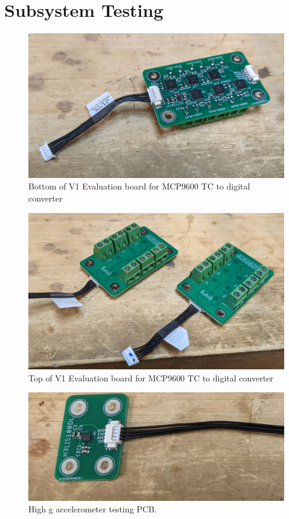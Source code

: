\documentclass{article}
\begin{document}
\section{Subsystem Testing}
\label{appb}

\begin{figure}[H]
	\centering
	\includegraphics[width=\textwidth]{images/tc-board-bottom}
	\caption{Bottom of V1 Evaluation board for MCP9600 TC to digital converter}
	\label{fig:tc-board-bottom}
\end{figure}

\begin{figure}[h!]
	\centering
	\includegraphics[width=\textwidth]{images/tc-board-top}
	\caption{Top of V1 Evaluation board for MCP9600 TC to digital converter}
	\label{fig:tc-board-top}
\end{figure}

\begin{figure}[h!]
	\centering
	\includegraphics[width=\textwidth]{images/100g-accel-board}
	\caption{High g accelerometer testing PCB.}
	\label{fig:accel-board}
\end{figure}
\end{document}
